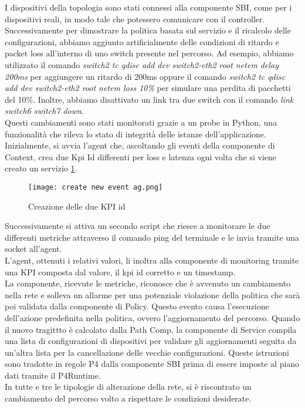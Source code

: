 I dispositivi della topologia sono stati connessi alla componente SBI, come per i dispositivi reali, in modo tale che potessero comunicare con il controller.
Successivamente per dimostrare la politica basata sul servizio e il ricalcolo delle configurazioni, abbiamo aggiunto artificialmente delle condizioni di ritardo e packet loss all’interno di uno switch presente nel percorso. 
Ad esempio, abbiamo utilizzato il comando \textit{switch2 tc qdisc add dev switch2-eth2 root netem delay 200ms} per aggiungere un ritardo di 200ms oppure il comando \textit{switch2 tc qdisc add dev switch2-eth2 root netem loss 10\%}
 per simulare una perdita di pacchetti del 10\%. Inoltre, abbiamo disattivato un link tra due switch con il comando \textit{link switch6 switch7 down}.
\\Questi cambiamenti sono stati monitorati grazie a un probe in Python, una funzionalità che rileva lo stato di integrità delle istanze dell'applicazione.
Inizialmente, si avvia l'agent che, ascoltando gli eventi della componente di Context, crea due Kpi Id differenti per loss e latenza ogni volta che si viene creato un servizio \ref{fig:agent}.
\begin{figure}[h]
    \centering
   \texttt{[image: create new event ag.png]}
    \caption{Creazione delle due KPI id}
    \label{fig:agent}
\end{figure}
Successivamente si attiva un secondo script che riesce a monitorare le due differenti metriche attraverso il comando ping del terminale e le invia tramite una socket all'agent.
\\L'agent, ottenuti i relativi valori, li inoltra alla componente di monitoring tramite una KPI composta dal valore, il kpi id corretto e un timestamp.
\\La componente, ricevute le metriche, riconosce che è avvenuto un cambiamento nella rete e solleva un allarme per una potenziale violazione della politica che sarà poi validata dalla componente di Policy.
Questo evento causa l'esecuzione dell'azione predefinita nella politica, ovvero l'aggiornamento del percorso.
Quando il nuovo tragittto è calcolato dalla Path Comp, la componente di Service compila una lista di configurazioni di dispositivi per validare gli aggiornamenti 
seguita da un'altra lista per la cancellazione delle vecchie configurazioni. Queste istruzioni sono tradotte in regole P4 dalla componente SBI prima di essere imposte al piano dati 
tramite il P4Runtime.
\\In tutte e tre le tipologie di alterazione della rete, si è riscontrato un cambiamento del percorso volto a rispettare le condizioni desiderate. 

